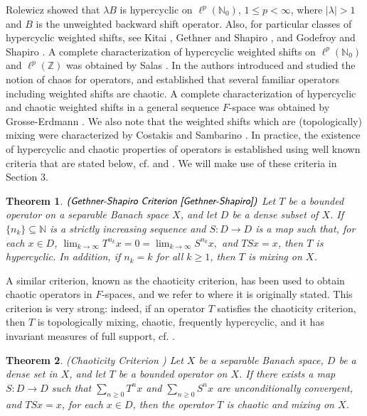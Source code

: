 \documentclass[12pt, reqno]{amsart}
\newtheorem{theorem}{Theorem}[section]
\theoremstyle{definition}
\theoremstyle{remark}
\numberwithin{equation}{section}
\begin{document}
Rolewicz \cite{Rolewicz} showed that $\lambda B$ is hypercyclic on $\ell^p(\mathbb{N}_0)$, $1\leq p<\infty$, where $|\lambda|>1$ and $B$ is the unweighted backward shift operator. Also, for particular classes of hypercyclic weighted shifts, see Kitai \cite{Kitai}, Gethner and Shapiro \cite{Gethner-Shapiro}, and Godefroy and Shapiro \cite{Godefroy-Shapiro}. A complete characterization of hypercyclic weighted shifts on $\ell^p(\mathbb{N}_{0})$ and $\ell^p(\mathbb{Z})$ was obtained by Salas \cite{Salas-hc}. In \cite{Godefroy-Shapiro} the authors introduced and studied the notion of chaos for operators, and established that several familiar operators including weighted shifts are chaotic. A complete characterization of hypercyclic and chaotic weighted shifts in a general sequence $F$-space was obtained by Grosse-Erdmann \cite{Erdmann}. We also note that the weighted shifts which are (topologically) mixing were characterized by Costakis and Sambarino \cite{Costakis}. In practice, the existence of hypercyclic and chaotic properties of operators is established using well known criteria that are stated below, cf. \cite{Bayart-Matheron} and \cite{Erdmann-Peris}. We will make use of these criteria in Section $3$.

\begin{theorem}\label{thm-hypc} $\emph{\textsf{(Gethner-Shapiro Criterion~\cite{Gethner-Shapiro})}}$
Let $T$ be a bounded operator on a separable Banach space $X$, and let $D$ be a dense subset of $X$. If $\{n_k\} \subseteq \mathbb{N}$ is a strictly
increasing sequence and $S:D\rightarrow D$ is a map such that, for each $x\in D$, $\lim_{k\rightarrow \infty} T^{n_k}x=0=\lim_{k\rightarrow \infty}S^{n_k}x,$ and $TSx=x$, then $T$ is hypercyclic. In addition, if $n_k=k$ for all $k\geq 1$, then $T$ is mixing on $X$.
\end{theorem}
A similar criterion, known as the chaoticity criterion, has been used to obtain chaotic operators in $F$-spaces, and we refer to \cite{Bonilla-Erdmann1} where it is originally stated. This criterion is very strong: indeed, if an operator $T$ satisfies the chaoticity criterion, then $T$ is topologically mixing, chaotic, frequently hypercyclic, and it has invariant measures of full support, cf. \cite{Bayart-Matheron}.

\begin{theorem}\emph{\textsf{(Chaoticity Criterion \cite{Bonilla-Erdmann1})}} \label{chaos}
Let $X$ be a separable Banach space, $D$ be a dense set in $X$, and let $T$ be a bounded operator on $X$. If there exists a map $S:D\rightarrow D$ such that $\sum_{n\geq 0} T^nx$ and $\sum_{n\geq 0} S^nx$ are unconditionally convergent, and $TSx=x$,
for each $x\in D$, then the operator $T$ is chaotic and mixing on $X$. 
\end{theorem}
\end{document}
